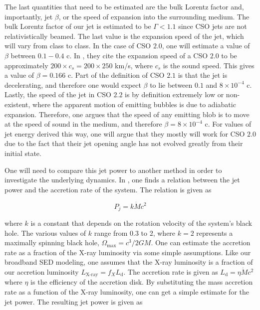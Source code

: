 The last quantities that need to be estimated are the bulk Lorentz factor and, importantly, jet $\beta$, or the speed of expansion into the surrounding medium. The bulk Lorentz factor of our jet is estimated to be $\Gamma < 1.1$ since CSO jets are not relativistically beamed. The last value is the expansion speed of the jet, which will vary from class to class. In the case of CSO $2.0$, one will estimate a value of $\beta$ between $0.1 - 0.4$ c. In \cite{sullivan2024smallscale}, they cite the expansion speed of a CSO $2.0$ to be approximately $200 \times c_s = 200 \times 250$ km/s, where $c_s$ is the sound speed. This gives a value of $\beta = 0.166$ c. Part of the definition of CSO $2.1$ is that the jet is decelerating, and therefore one would expect $\beta$ to lie between $0.1$ and $8\times 10^{-4}$ c. Lastly, the speed of the jet in CSO $2.2$ is by definition extremely low or non-existent, where the apparent motion of emitting bubbles is due to adiabatic expansion. Therefore, one argues that the speed of any emitting blob is to move at the speed of sound in the medium, and therefore $\beta = 8\times 10^{-4}$ c. For values of jet energy derived this way, one will argue that they mostly will work for CSO $2.0$ due to the fact that their jet opening angle has not evolved greatly from their initial state.

One will need to compare this jet power to another method in order to investigate the underlying dynamics. In \cite{Blandford_1977}, one finds a relation between the jet power and the accretion rate of the system. The relation is given as

\begin{equation}
    P_j = k \dot{M} c^2
\end{equation}

where $k$ is a constant that depends on the rotation velocity of the system's black hole. The various values of $k$ range from $0.3$ to $2$, where $k=2$ represents a maximally spinning black hole, $\Omega_{\text{max}} = c^3/2GM$. One can estimate the accretion rate as a fraction of the X-ray luminosity via some simple assumptions. Like our broadband SED modeling, one assumes that the X-ray luminosity is a fraction of our accretion luminosity $L_{\text{X-ray}} = f_X L_{\text{d}}$. The accretion rate is given as $L_{\text{d}} = \eta \dot{M} c^2$ where $\eta$ is the efficiency of the accretion disk. By substituting the mass accretion rate as a function of the X-ray luminosity, one can get a simple estimate for the jet power. The resulting jet power is given as

